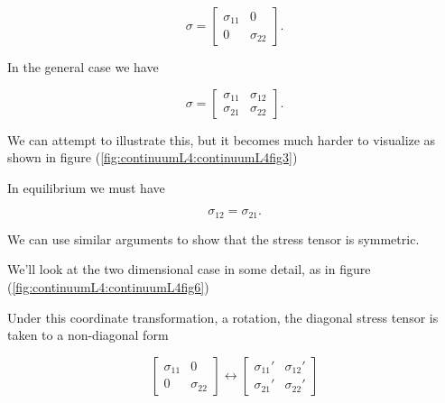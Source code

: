 \begin{equation}\label{eqn:continuumL4:50}
\sigma = 
\begin{bmatrix}
\sigma_{11} & 0 \\
0 & \sigma_{22}
\end{bmatrix}.
\end{equation}

In the general case we have

\begin{equation}\label{eqn:continuumL4:70}
\sigma = 
\begin{bmatrix}
\sigma_{11} & \sigma_{12} \\
\sigma_{21} & \sigma_{22}
\end{bmatrix}.
\end{equation}

We can attempt to illustrate this, but it becomes much harder to visualize as shown in figure (\ref{fig:continuumL4:continuumL4fig3})

In equilibrium we must have

\begin{equation}\label{eqn:continuumL4:90}
\sigma_{12} = \sigma_{21}.
\end{equation}

We can use similar arguments to show that the stress tensor is symmetric.

We'll look at the two dimensional case in some detail, as in figure (\ref{fig:continuumL4:continuumL4fig6})


Under this coordinate transformation, a rotation, the diagonal stress tensor is taken to a non-diagonal form 

\begin{equation}\label{eqn:continuumL4:130}
\begin{bmatrix}
\sigma_{11} & 0 \\
0 & \sigma_{22} 
\end{bmatrix}
\leftrightarrow
\begin{bmatrix}
\sigma_{11}' & \sigma_{12}' \\
\sigma_{21}' & \sigma_{22}' 
\end{bmatrix}
\end{equation}

